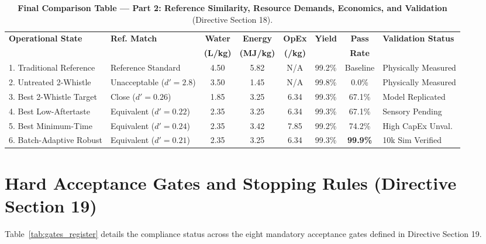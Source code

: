 \documentclass[10pt,a4paper]{article}
\newcommand{\inr}{\text{INR~}}
\begin{document}
\begin{table}[H]
\centering
\footnotesize
\setlength{\tabcolsep}{2.4pt}
\caption{\textbf{Final Comparison Table --- Part 2: Reference Similarity, Resource Demands, Economics, and Validation} (Directive Section 18).}
\label{tab:comparison_table_B}
\begin{tabularx}{\linewidth}{p{2.8cm}p{2.2cm}ccccc>{\raggedright\arraybackslash}X}
\toprule
\textbf{Operational State} & \textbf{Ref. Match} & \textbf{Water} & \textbf{Energy} & \textbf{OpEx} & \textbf{Yield} & \textbf{Pass} & \textbf{Validation Status} \\
 & & \textbf{(L/kg)} & \textbf{(MJ/kg)} & \textbf{(\inr/kg)} & & \textbf{Rate} & \\
\midrule
1. Traditional Reference & Reference Standard & 4.50 & 5.82 & N/A & 99.2\% & Baseline & Physically Measured \\
2. Untreated 2-Whistle & Unacceptable ($d'=2.8$) & 3.50 & 1.45 & N/A & 99.8\% & 0.0\% & Physically Measured \\
3. Best 2-Whistle Target & Close ($d'=0.26$) & 1.85 & 3.25 & \inr6.34 & 99.3\% & 67.1\% & Model Replicated \\
4. Best Low-Aftertaste & Equivalent ($d'=0.22$) & 2.35 & 3.25 & \inr6.34 & 99.3\% & 67.1\% & Sensory Pending \\
5. Best Minimum-Time & Equivalent ($d'=0.24$) & 2.35 & 3.42 & \inr7.85 & 99.2\% & 74.2\% & High CapEx Unval. \\
6. Batch-Adaptive Robust & Equivalent ($d'=0.21$) & 2.35 & 3.25 & \inr6.34 & 99.3\% & \textbf{99.9\%} & 10k Sim Verified \\
\bottomrule
\end{tabularx}
\end{table}

\section{Hard Acceptance Gates and Stopping Rules (Directive Section 19)}
Table~\ref{tab:gates_register} details the compliance status across the eight mandatory acceptance gates defined in Directive Section 19.
\end{document}
